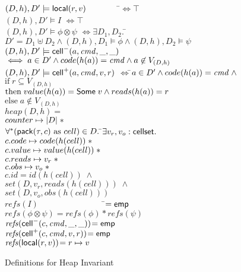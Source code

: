 \begin{figure}
\begin{tabbing}
$(D,h), D' \models \mathsf{local}({r}, {v}) \qquad \qquad$\=$\iff \top$ \\
$(D,h), D' \models I$                            \>$\iff \top$ \\
$(D,h), D' \models \phi \otimes \psi$            \>$\iff \exists D_1, D_2.\;$\=$D' = D_1 \uplus D_2 
                                                      \land (D,h), D_1 \models \phi
                                                      \land (D,h), D_2 \models \psi$ \\
$(D,h), D' \models \mathsf{cell}^{-}({a}, {\mathit{cmd}}, {\_}, {\_})$               \>$\iff a \in D' \land code(h(a)) = \mathit{cmd} \land a \not \in V_{(D,h)}$ \\
$(D,h), D' \models \mathsf{cell}^{+}({a}, {\mathit{cmd}}, {v}, {r})$         \>$\iff $\=$ a \in D' \land code(h(a)) = \mathit{cmd} \;\land$ \\
\>      \>$\mathrm{if}\;r \subseteq V_{(D,h)}$ \\
\>      \>$\mathrm{then}\;value(h(a)) = \mathsf{Some}\;v \land reads(h(a)) = r$ \\
\>      \>$\mathrm{else}\;a \not\in V_{(D,h)}$\\[1em]
 

$heap(D,h) = $ \\
\;\;$counter \mapsto |D| \;* $ \\
\;\;$\forall^* (\mathsf{pack}({\tau}, {c})\mbox{ as }cell) \in D.\;$\=$\exists v_r, v_o : \mathsf{cellset}.\;$ \\
                         \>$c.code \mapsto code(h(cell))   \;* $ \\
                         \>$c.value \mapsto value(h(cell)) \;* $ \\
                         \>$c.reads \mapsto v_r \;* $ \\
                         \>$c.obs   \mapsto v_o \;* $ \\
                         \>$c.id    = id(h(cell)) \;\land$ \\
                         \>$set(D, v_r, reads(h(cell))) \;\land$ \\
                         \>$set(D, v_o, obs(h(cell)))$ \\[1em]

$\mathit{refs}(I) \qquad\qquad\qquad\qquad$\=$= \mathsf{emp}$ \\
$\mathit{refs}(\phi \otimes \psi) $\>$= \mathit{refs}(\phi) * \mathit{refs}(\psi)$ \\
$\mathit{refs}(\mathsf{cell}^{-}({c}, {\mathit{cmd}}, {\_}, {\_})) $\>$= \mathsf{emp}$ \\
$\mathit{refs}(\mathsf{cell}^{+}({c}, {\mathit{cmd}}, {v}, {r})) $\>$= \mathsf{emp}$ \\
$\mathit{refs}(\mathsf{local}({r}, {v})) $\>$= r \mapsto v$ \\
\end{tabbing}

\caption{Definitions for Heap Invariant}
\label{heap-invariant}
\end{figure}

